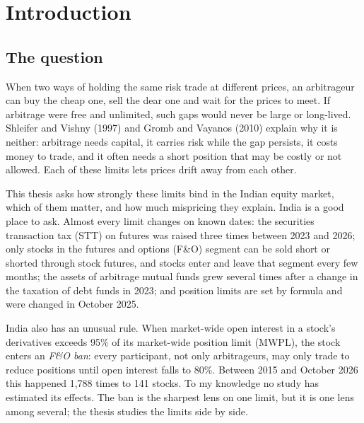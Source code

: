 \chapter{Introduction}\label{ch:intro}

\section{The question}
When two ways of holding the same risk trade at different prices, an arbitrageur can buy the cheap one, sell the dear one
and wait for the prices to meet. If arbitrage were free and unlimited, such gaps would never be large or long-lived.
Shleifer and Vishny (1997) and Gromb and Vayanos (2010) explain why it is neither: arbitrage needs capital, it carries
risk while the gap persists, it costs money to trade, and it often needs a short position that may be costly or not
allowed. Each of these limits lets prices drift away from each other.

This thesis asks how strongly these limits bind in the Indian equity market, which of them matter, and how much
mispricing they explain. India is a good place to ask. Almost every limit changes on known dates: the securities
transaction tax (STT) on futures was raised three times between 2023 and 2026; only stocks in the futures and options
(F\&O) segment can be sold short or shorted through stock futures, and stocks enter and leave that segment every few
months; the assets of arbitrage mutual funds grew several times after a change in the taxation of debt funds in 2023; and
position limits are set by formula and were changed in October 2025.

India also has an unusual rule. When market-wide open interest in a stock's derivatives exceeds 95\% of its market-wide
position limit (MWPL), the stock enters an \emph{F\&O ban}: every participant, not only arbitrageurs, may only trade to
reduce positions until open interest falls to 80\%. Between 2015 and October 2026 this happened 1,788 times to 141 stocks.
To my knowledge no study has estimated its effects. The ban is the sharpest lens on one limit, but it is one lens among
several; the thesis studies the limits side by side.

